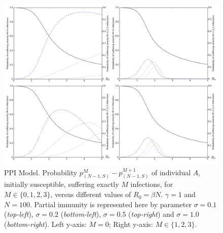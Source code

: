 \documentclass[preprint,12pt]{elsarticle}
\begin{document}
\begin{figure}[h!]
  \centering
 \includegraphics[width=\textwidth]{PPI.jpg}
 \caption{PPI Model. Probability $p_{(N-1,S)}^M-p_{(N-1,S)}^{M+1}$ of individual $A$, initially susceptible, suffering exactly $M$ infections, for $M\in\{0,1,2,3\}$, versus different values of $R_0=\beta N$. $\gamma=1$ and $N=100$.
Partial immunity is represented here by parameter $\sigma=0.1$ ({\it top-left}), $\sigma=0.2$ ({\it bottom-left}), $\sigma=0.5$ ({\it top-right}) and
$\sigma=1.0$ ({\it bottom-right}). Left y-axis: $M=0$; Right y-axis: $M\in\{1,2,3\}$.}
 \label{fig:siri}
\end{figure}
\end{document}
